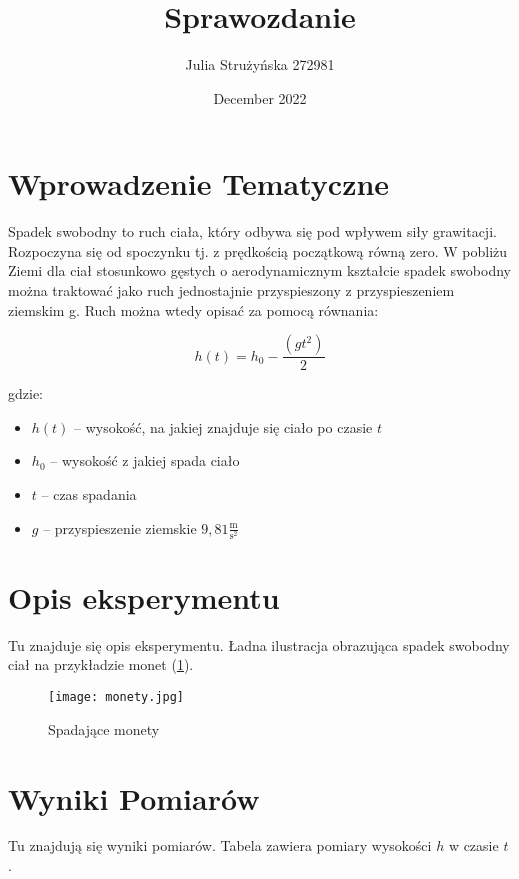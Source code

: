 \documentclass{article}
\title{Sprawozdanie}
\author{Julia Strużyńska 272981}
\date{December 2022}
\begin{document}
\maketitle
\section{Wprowadzenie Tematyczne}
Spadek swobodny to ruch ciała, który odbywa się pod wpływem siły grawitacji. Rozpoczyna się od spoczynku tj. z prędkością początkową równą zero. W pobliżu Ziemi dla ciał stosunkowo gęstych o aerodynamicznym kształcie spadek swobodny można traktować jako ruch jednostajnie przyspieszony z przyspieszeniem ziemskim g. Ruch można wtedy opisać za pomocą równania:

\begin{equation}
h(t)=h_0-\frac{(gt^2)} {2}
\end{equation}

gdzie:
\begin{itemize}
	\item \(h(t)\) – wysokość, na jakiej znajduje się ciało po czasie \(t\)
	\item \(h_0\) – wysokość z jakiej spada ciało
	\item \(t\) – czas spadania
	\item \(g\) – przyspieszenie ziemskie \(9,81 \frac{\text{m}} {\text{s}^2}\)
\end{itemize}

\maketitle
\section{Opis eksperymentu}

Tu znajduje się opis eksperymentu. Ładna ilustracja obrazująca spadek swobodny ciał na przykładzie monet (\ref{fig:spadek.swobodny}).

\begin{figure}[htbp]
    \centering
    \texttt{[image: monety.jpg]}
    \caption{Spadające monety}
    \label{fig:spadek.swobodny}
\end{figure}

\maketitle
\section{Wyniki Pomiarów}
Tu znajdują się wyniki pomiarów. Tabela zawiera pomiary wysokości $h$ w czasie $t$.
\end{document}
